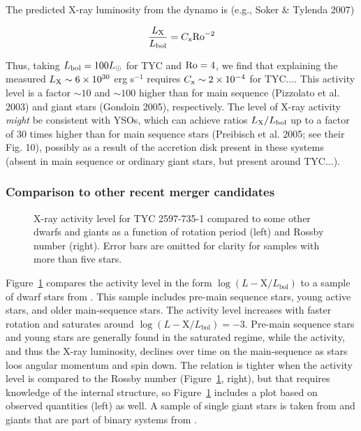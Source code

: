 \documentclass[]{aastex631}
\begin{document}
The predicted X-ray luminosity from the dynamo is (e.g., Soker \& Tylenda 2007)

\begin{equation}
\frac{L_{\rm X}}{L_{\rm bol}} = C_{\rm x}{\rm Ro}^{-2}
\end{equation}

Thus, taking $L_{\rm bol} = 100L_{\odot}$ for TYC and ${\rm Ro} = 4$, we find that explaining the measured $L_{\rm X} \sim 6\times 10^{30}$ erg s$^{-1}$ requires $C_{\rm x} \sim 2\times 10^{-4}$ for TYC....  This activity level is a factor $\sim 10$ and $\sim 100$ higher than for main sequence (Pizzolato et al. 2003) and giant stars (Gondoin 2005), respectively.  The level of X-ray activity {\it might} be consistent with YSOs, which can achieve ratios $L_{\rm X}/L_{\rm bol}$ up to a factor of 30 times higher than for main sequence stars (Preibisch et al. 2005; see their Fig. 10), possibly as a result of the accretion disk present in these systems (absent in main sequence or ordinary giant stars, but present around TYC...).

\subsubsection{Comparison to other recent merger candidates}
\begin{figure}
    \caption{X-ray activity level for TYC 2597-735-1 compared to some other dwarfs and giants as a function of rotation period (left) and Rossby number (right). Error bars are omitted for clarity for samples with more than five stars.
    \label{fig:lxbol}}
\end{figure}

Figure~\ref{fig:lxbol} compares the activity level in the form $\log(L-\mathrm{X}/L_\mathrm{bol})$ to a sample of dwarf stars from \citet{Wright+2011}. This sample includes pre-main sequence stars, young active stars, and older main-sequence stars. The activity level increases with faster rotation and saturates around $\log(L-\mathrm{X}/L_\mathrm{bol})=-3$. Pre-main sequence stars and young stars are generally found in the saturated regime, while the activity, and thus the X-ray luminosity, declines over time on the main-sequence as stars loos angular momentum and spin down. The relation is tighter when the activity level is compared to the Rossby number (Figure~\ref{fig:lxbol}, right), but that requires knowledge of the internal structure, so Figure~\ref{fig:lxbol} includes a plot based on observed quantities (left) as well. A sample of single giant stars is taken from \citet{2005A&A...444..531G} and giants that are part of binary systems from \citet{2007A&A...464.1101G}.
\end{document}
